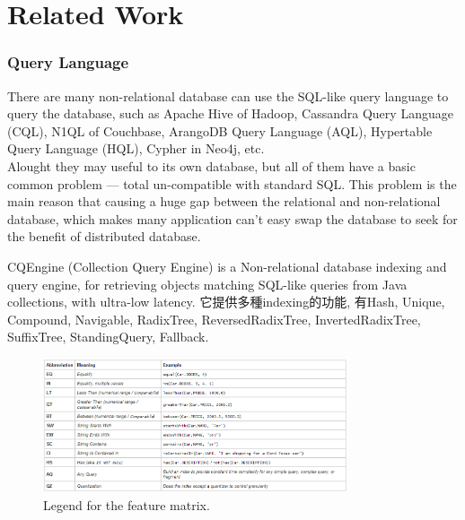\chapter{Related Work}
\label{chapter:related-work}

\baselineskip=26pt
\thispagestyle{empty}

\subsection{Query Language}

There are many non-relational database can use the SQL-like query language to query the database, such as Apache Hive of Hadoop, Cassandra Query Language (CQL), N1QL of Couchbase, ArangoDB Query Language (AQL), Hypertable Query Language (HQL), Cypher in Neo4j, etc.\\

Alought they may useful to its own database, but all of them have a basic common problem --- total un-compatible with standard SQL. This problem is the main reason that causing a huge gap between the relational and non-relational database, which makes many application can't easy swap the database to seek for the benefit of distributed database.

\medskip
CQEngine (Collection Query Engine) is a Non-relational database indexing and query engine, for retrieving objects matching SQL-like queries from Java collections, with ultra-low latency. 它提供多種indexing的功能, 有Hash, Unique, Compound, Navigable, RadixTree, ReversedRadixTree, InvertedRadixTree, SuffixTree, StandingQuery, Fallback.

\begin{figure}[h]
\centering
\includegraphics[width=0.8\textwidth]{./related-work/pic/CQEngine/CQEngine_index_1.png}
\caption{Legend for the feature matrix.}
\label{fig:related-work:legend_feature_matrix}
\end{figure}

